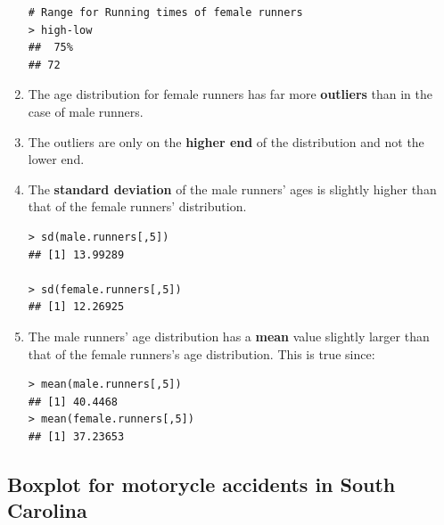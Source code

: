 \documentclass[12pt,letterpaper,titlepage,en-US]{article}
\begin{document}
\begin{enumerate}
\begin{knitrout}
\begin{kframe}
\begin{verbatim}
# Range for Running times of female runners
> high-low
##  75% 
## 72
\end{verbatim}
\end{kframe}
\end{knitrout}


\item The age distribution for female runners has far more \textbf{outliers} than in the case of male runners.

\item The outliers are only on the \textbf{higher end} of the distribution and not the lower end.


\item The \textbf{standard deviation} of the male runners' ages is slightly higher than that of the female runners' distribution.
\begin{knitrout}
\color{fgcolor}
\begin{kframe}

\begin{verbatim}
> sd(male.runners[,5])
## [1] 13.99289

> sd(female.runners[,5])
## [1] 12.26925
\end{verbatim}
\end{kframe}
\end{knitrout}



\item The male runners' age distribution has a \textbf{mean} value slightly larger than that of the female runners's age distribution. This is true since:

\begin{knitrout}
\color{fgcolor}
\begin{kframe}

\begin{verbatim}
> mean(male.runners[,5])
## [1] 40.4468
> mean(female.runners[,5])
## [1] 37.23653
\end{verbatim}
\end{kframe}
\end{knitrout}

\end{enumerate}




\subsection{Boxplot for motorycle accidents in South Carolina}
\end{document}
